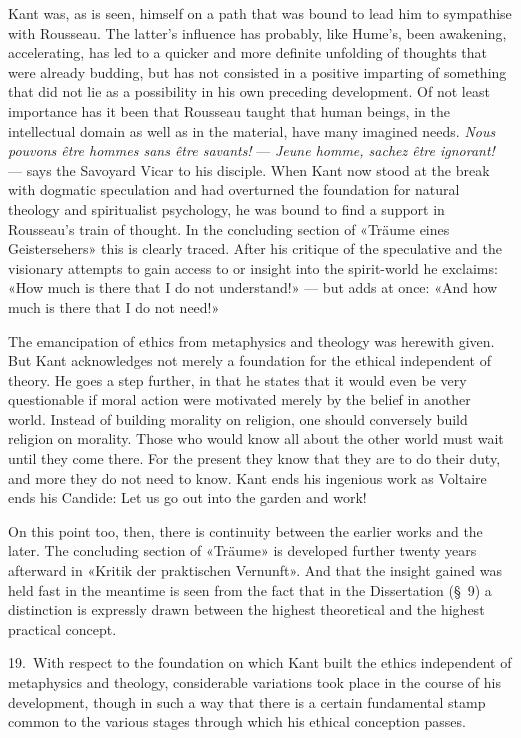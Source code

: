 \documentclass[12pt,a4paper]{article}
\newcommand{\opage}[1]{\marginnote{\footnotesize\textit{[#1]}}}
\begin{document}
Kant was, as is seen, himself on a path that was bound to lead him to
sympathise with Rousseau. The latter's influence has probably, like Hume's,
been awakening, accelerating, has led to a quicker and more definite
unfolding of thoughts that were already budding, but has not consisted in a
positive imparting of something that did not lie as a possibility in his
own preceding development. Of not least importance has it been that
Rousseau taught that human beings, in the intellectual domain as well as in
the material, have many imagined needs. \textit{Nous pouvons être hommes
sans être savants!} --- \textit{Jeune homme, sachez être ignorant!} ---
says the Savoyard Vicar to his disciple. When Kant now stood at the break
with dogmatic speculation and had overturned the foundation for natural
theology and spiritualist psychology, he was bound to find a support in
Rousseau's train of thought. In the concluding section of «Träume eines
Geistersehers» this is clearly traced. After his critique of the
speculative and the visionary attempts to gain access to or insight into
the spirit-world he exclaims: «How much is there that I do not understand!»
--- but adds at once: «And how much is there that I do not need!»

The emancipation of ethics from metaphysics and theology was herewith
given. But Kant acknowledges not merely a foundation for the ethical
independent of theory. He goes a step further, in that he states that it
would even be very questionable if moral action were motivated merely by
the belief in another world. Instead of building morality on religion, one
should conversely build religion on morality. Those who would know all
about the other world must wait until they come there. For the present \opage{39}they
know that they are to do their duty, and more they do not need to know.
Kant ends his ingenious work as Voltaire ends his Candide: Let us go out
into the garden and work!

On this point too, then, there is continuity between the earlier works and
the later. The concluding section of «Träume» is developed further twenty
years afterward in «Kritik der praktischen Vernunft». And that the insight
gained was held fast in the meantime is seen from the fact that in the
Dissertation (§\ 9) a distinction is expressly drawn between the highest
theoretical and the highest practical concept.

19.\ With respect to the foundation on which Kant built the ethics
independent of metaphysics and theology, considerable variations took place
in the course of his development, though in such a way that there is a
certain fundamental stamp common to the various stages through which his
ethical conception passes.
\end{document}
